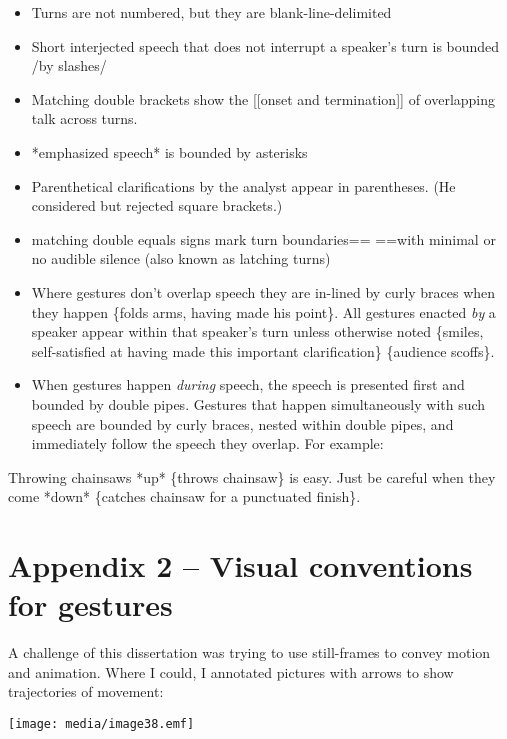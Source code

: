 \begin{itemize}
\item
  Turns are not numbered, but they are blank-line-delimited
\item
  Short interjected speech that does not interrupt a speaker's turn is
  bounded /by slashes/
\item
  Matching double brackets show the {[}{[}onset and termination{]}{]} of
  overlapping talk across turns.
\item
  *emphasized speech* is bounded by asterisks
\item
  Parenthetical clarifications by the analyst appear in parentheses. (He
  considered but rejected square brackets.)
\item
  matching double equals signs mark turn boundaries== ==with minimal or
  no audible silence (also known as latching turns)
\item
  Where gestures don't overlap speech they are in-lined by curly braces
  when they happen \{folds arms, having made his point\}. All gestures
  enacted \emph{by} a speaker appear within that speaker's turn unless
  otherwise noted \{smiles, self-satisfied at having made this important
  clarification\} \{audience scoffs\}.
\item
  When gestures happen \emph{during} speech, the speech is presented
  first and bounded by double pipes. Gestures that happen simultaneously
  with such speech are bounded by curly braces, nested within double
  pipes, and immediately follow the speech they overlap. For example:
\end{itemize}

Throwing chainsaws \textbar{}\textbar{}*up*\textbar{}\textbar{}
\textbar{}\{throws chainsaw\}\textbar{} is easy. Just be careful when
they come \textbar{}\textbar{}*down*\textbar{}\textbar{}
\textbar{}\{catches chainsaw for a punctuated finish\}\textbar{}.

\section{Appendix 2 -- Visual conventions for
gestures}\label{appendix-2-visual-conventions-for-gestures}

A challenge of this dissertation was trying to use still-frames to
convey motion and animation. Where I could, I annotated pictures with
arrows to show trajectories of movement:

\texttt{[image: media/image38.emf]}

